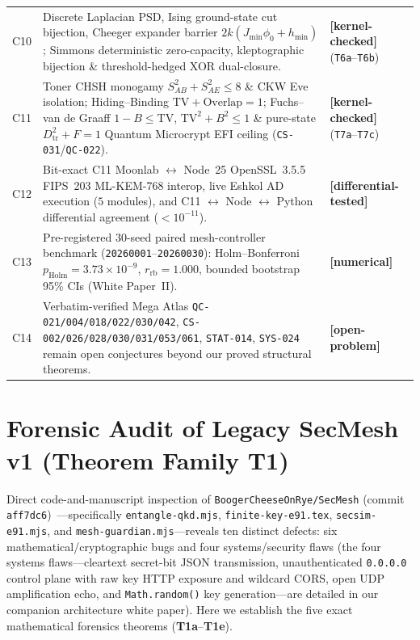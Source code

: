 \documentclass[11pt,reqno]{amsart}
\theoremstyle{definition}
\newcommand{\code}[1]{\texttt{\small #1}}
\newcommand{\tagkc}{\textcolor{teal!70!black}{\textbf{\textsf{[kernel-checked]}}}}
\newcommand{\tagdt}{\textcolor{blue!65!black}{\textbf{\textsf{[differential-tested]}}}}
\newcommand{\tagnm}{\textcolor{orange!75!black}{\textbf{\textsf{[numerical]}}}}
\newcommand{\tagop}{\textcolor{purple!75!black}{\textbf{\textsf{[open-problem]}}}}
\begin{document}
\begin{table}[t]
\begin{tabularx}{\linewidth}{@{}l Y l@{}}
C10 & Discrete Laplacian PSD, Ising ground-state cut bijection, Cheeger expander barrier $2k(J_{\min}\phi_0+h_{\min})$; Simmons deterministic zero-capacity, kleptographic bijection \& threshold-hedged XOR dual-closure. & \tagkc{} (\code{T6a}--\code{T6b}) \\
C11 & Toner CHSH monogamy $S_{AB}^2{+}S_{AE}^2 \le 8$ \& CKW Eve isolation; Hiding--Binding $\mathrm{TV}{+}\mathrm{Overlap}=1$; Fuchs--van de Graaff $1{-}B \le \mathrm{TV}$, $\mathrm{TV}^2{+}B^2 \le 1$ \& pure-state $D_{\mathrm{tr}}^2{+}F=1$ Quantum Microcrypt EFI ceiling (\code{CS-031}/\code{QC-022}). & \tagkc{} (\code{T7a}--\code{T7c}) \\
C12 & Bit-exact C11 Moonlab $\leftrightarrow$ Node~25 OpenSSL~3.5.5 FIPS~203 ML-KEM-768 interop, live Eshkol AD execution ($5$ modules), and C11 $\leftrightarrow$ Node $\leftrightarrow$ Python differential agreement ($<10^{-11}$). & \tagdt{} \\
C13 & Pre-registered $30$-seed paired mesh-controller benchmark (\code{20260001}--\code{20260030}): Holm--Bonferroni $p_{\mathrm{Holm}}=3.73{\times}10^{-9}$, $r_{\mathrm{rb}}=1.000$, bounded bootstrap 95\% CIs (White Paper~II). & \tagnm{} \\
C14 & Verbatim-verified Mega Atlas \code{QC-021/004/018/022/030/042}, \code{CS-002/026/028/030/031/053/061}, \code{STAT-014}, \code{SYS-024} remain open conjectures beyond our proved structural theorems. & \tagop{} \\
\bottomrule
\end{tabularx}
\end{table}

\section{Forensic Audit of Legacy SecMesh v1 (Theorem Family T1)}
\label{sec:forensics}

Direct code-and-manuscript inspection of \code{BoogerCheeseOnRye/SecMesh} (commit \code{aff7dc6})~\cite{secmesh_upstream}---specifically \code{entangle-qkd.mjs}, \code{finite-key-e91.tex}, \code{secsim-e91.mjs}, and \code{mesh-guardian.mjs}---reveals ten distinct defects: six mathematical/cryptographic bugs and four systems/security flaws (the four systems flaws---cleartext secret-bit JSON transmission, unauthenticated \code{0.0.0.0} control plane with raw key HTTP exposure and wildcard CORS, open UDP amplification echo, and \code{Math.random()} key generation---are detailed in our companion architecture white paper).
Here we establish the five exact mathematical forensics theorems (\textbf{T1a}--\textbf{T1e}).
\end{document}
